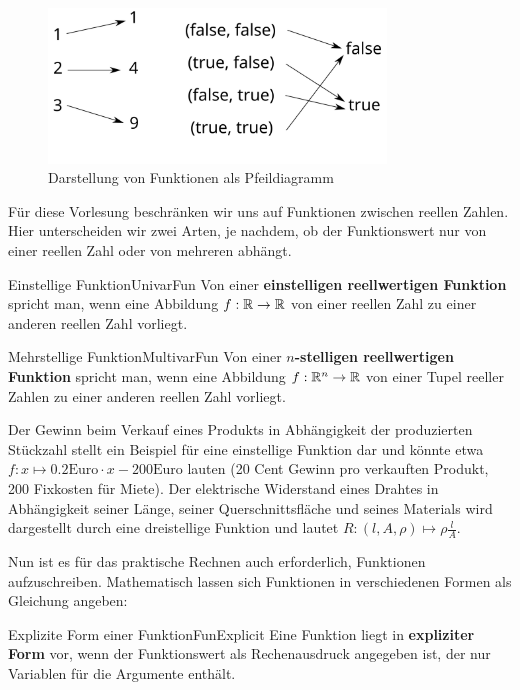 \begin{figure}
    \centering
    \includegraphics[width=0.8\textwidth]{./svg/function-as-arrows}
    \caption{Darstellung von Funktionen als Pfeildiagramm}
    \label{fig:FunAsArrows}
\end{figure}

Für diese Vorlesung beschränken wir uns auf Funktionen zwischen reellen Zahlen. Hier unterscheiden wir zwei Arten, je nachdem, ob der Funktionswert nur von einer reellen Zahl oder von mehreren abhängt.

\begin{definition}{Einstellige Funktion}{UnivarFun}
    Von einer \textbf{einstelligen reellwertigen Funktion} spricht man, wenn eine Abbildung $f: \mathbb{R} \to \mathbb{R}$ von einer reellen Zahl zu einer anderen reellen Zahl vorliegt.
\end{definition}

\begin{definition}{Mehrstellige Funktion}{MultivarFun}
    Von einer \textbf{$n$-stelligen reellwertigen Funktion} spricht man, wenn eine Abbildung $f: \mathbb{R}^n \to \mathbb{R}$ von einer Tupel reeller Zahlen zu einer anderen reellen Zahl vorliegt.
\end{definition}

Der Gewinn beim Verkauf eines Produkts in Abhängigkeit der produzierten Stückzahl stellt ein Beispiel für eine einstellige Funktion dar und könnte etwa $f: x \mapsto 0.2\text{Euro} \cdot x - 200\text{Euro}$ lauten (20 Cent Gewinn pro verkauften Produkt, 200  Fixkosten für Miete). Der elektrische Widerstand eines Drahtes in Abhängigkeit seiner Länge, seiner Querschnittsfläche und seines Materials wird dargestellt durch eine dreistellige Funktion und lautet $R: (l, A, \rho) \mapsto \rho \frac{l}{A}$.

Nun ist es für das praktische Rechnen auch erforderlich, Funktionen aufzuschreiben. Mathematisch lassen sich Funktionen in verschiedenen Formen als Gleichung angeben:

\begin{definition}{Explizite Form einer Funktion}{FunExplicit}
    Eine Funktion liegt in \textbf{expliziter Form} vor, wenn der Funktionswert als Rechenausdruck angegeben ist, der nur Variablen für die Argumente enthält.
\end{definition}

